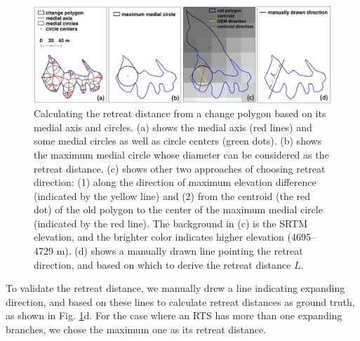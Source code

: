 \documentclass[authoryear,preprint,review,12pt]{elsarticle}
\begin{document}
\begin{figure} 
	\centering
	\includegraphics[width=14cm]{figs/retreat_distance_v2_trim.jpg}
	\caption{Calculating the retreat distance from a change polygon based on its medial axis and circles. (a) shows the medial axis (red lines) and some medial circles as well as circle centers (green dots). (b) shows the maximum medial circle whose diameter can be considered as the retreat distance. (c) shows other two approaches of choosing retreat direction: (1) along the direction of maximum elevation difference (indicated by the yellow line) and (2) from the centroid (the red dot) of the old polygon to the center of the maximum medial circle (indicated by the red line). The background in (c) is the SRTM elevation, and the brighter color indicates higher elevation (4695--4729 m). (d) shows a manually drawn line pointing the retreat direction, and based on which to derive the retreat distance $L$. }
	\label{fig_retreat_dis}
\end{figure}





To validate the retreat distance, we manually drew a line indicating expanding direction, and based on these lines to calculate retreat distances as ground truth, as shown in Fig. \ref{fig_retreat_dis}d. 
For the case where an RTS has more than one expanding branches, we chose the maximum one as its retreat distance. 



\end{document}

